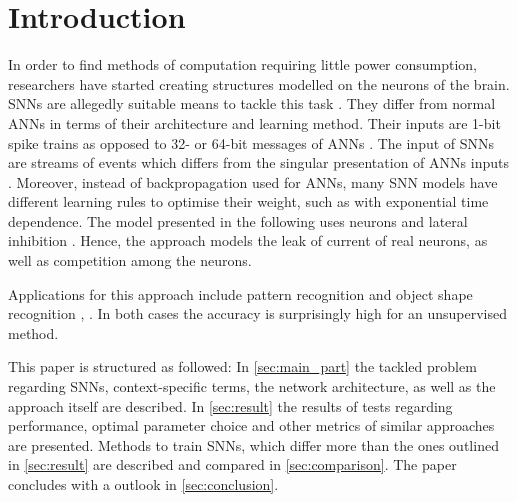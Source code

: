 \section{Introduction}

In order to find methods of computation requiring little power consumption, 
researchers have started creating structures modelled on the neurons of the brain.
\acp{SNN} are allegedly suitable means to tackle this task \cite{SNN}.
They differ from normal \acp{ANN} in terms of their architecture and learning method.
Their inputs are 1-bit spike trains as opposed to 32- or 64-bit messages of \acp{ANN} \cite{SNN}.
The input of \acp{SNN} are streams of events which differs from the singular presentation of \acp{ANN} inputs \cite{ANN_SNN_conversion}.
Moreover, instead of backpropagation used for \acp{ANN}, many \ac{SNN} models have different learning rules to optimise their weight, 
such as  with exponential time dependence.
The model presented in the following uses  neurons and lateral inhibition \cite{SNN}.
Hence, the approach models the leak of current of real neurons, as well as competition among the neurons.

Applications for this approach include pattern recognition \cite{SNN} and object shape recognition \cite{object_detection_SNN}, \cite{multi_scale_STDP}.
In both cases the accuracy is surprisingly high for an unsupervised method.

This paper is structured as followed:
In \autoref{sec:main_part} the tackled problem regarding \acp{SNN}, context-specific terms, the network architecture,
 as well as the approach itself are described.
In \autoref{sec:result} the results of tests regarding performance, optimal parameter choice and other metrics of similar approaches are presented.
Methods to train \acp{SNN}, which differ more than the ones outlined in \autoref{sec:result} are described and compared in \autoref{sec:comparison}.
The paper concludes with a outlook in \autoref{sec:conclusion}.